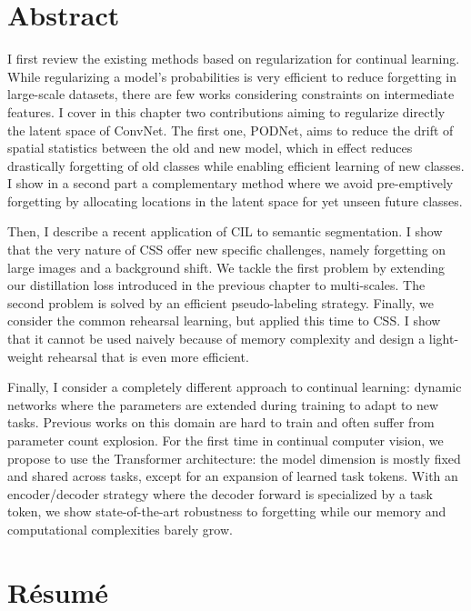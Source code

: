 \cleardoublepage
\setcounter{page}{1}

\chapter{Abstract}

I first review the existing methods based on regularization for continual learning. While
regularizing a model's probabilities is very efficient to reduce forgetting in large-scale datasets,
there are few works considering constraints on intermediate features. I cover in this chapter two
contributions aiming to regularize directly the latent space of \acs{ConvNet}. The first one,
PODNet, aims to reduce the drift of spatial statistics between the old and new model, which in
effect reduces drastically forgetting of old classes while enabling efficient learning of new
classes. I show in a second part a complementary method where we avoid pre-emptively forgetting by
allocating locations in the latent space for yet unseen future classes.

Then, I describe a recent application of \acf{CIL} to semantic segmentation. I show that
the very nature of \acf{CSS} offer new specific challenges, namely forgetting on large
images and a background shift. We tackle the first problem by extending our distillation
loss introduced in the previous chapter to multi-scales. The second problem is solved by
an efficient pseudo-labeling strategy. Finally, we consider the common rehearsal learning,
but applied this time to \ac{CSS}. I show that it cannot be used naively because of memory
complexity and design a light-weight rehearsal that is even more efficient.

Finally, I consider a completely different approach to continual learning: dynamic networks
where the parameters are extended during training to adapt to new tasks. Previous works on
this domain are hard to train and often suffer from parameter count explosion. For the
first time in continual computer vision, we propose to use the Transformer architecture:
the model dimension is mostly fixed and shared across tasks, except for an
expansion of learned task tokens. With an encoder/decoder strategy where the decoder
forward is specialized by a task token, we show state-of-the-art robustness to forgetting
while our memory and computational complexities barely grow.


\cleardoublepage


\chapter{R\'esum\'e}

